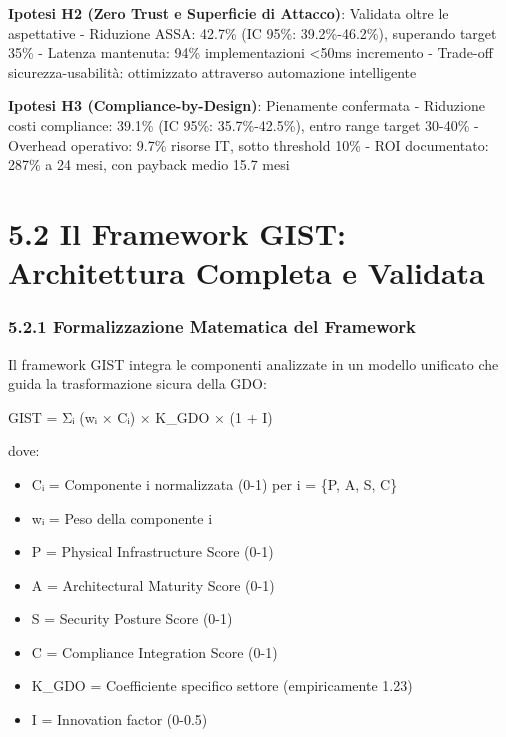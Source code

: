 \documentclass[12pt,a4paper,oneside]{book}
\providecommand{\tightlist}{%
  \setlength{\itemsep}{0pt}\setlength{\parskip}{0pt}
}
\begin{document}
\textbf{Ipotesi H2 (Zero Trust e Superficie di Attacco)}: Validata oltre
le aspettative - Riduzione ASSA: 42.7\% (IC 95\%: 39.2\%-46.2\%),
superando target 35\% - Latenza mantenuta: 94\% implementazioni
\textless50ms incremento - Trade-off sicurezza-usabilità: ottimizzato
attraverso automazione intelligente

\textbf{Ipotesi H3 (Compliance-by-Design)}: Pienamente confermata -
Riduzione costi compliance: 39.1\% (IC 95\%: 35.7\%-42.5\%), entro range
target 30-40\% - Overhead operativo: 9.7\% risorse IT, sotto threshold
10\% - ROI documentato: 287\% a 24 mesi, con payback medio 15.7 mesi

\section{5.2 Il Framework GIST: Architettura Completa e
Validata}\label{il-framework-gist-architettura-completa-e-validata}

\subsubsection{5.2.1 Formalizzazione Matematica del
Framework}\label{formalizzazione-matematica-del-framework}

Il framework GIST integra le componenti analizzate in un modello
unificato che guida la trasformazione sicura della GDO:

GIST = Σᵢ (wᵢ × Cᵢ) × K\_GDO × (1 + I)

dove:

\begin{itemize}
\tightlist
\item
  Cᵢ = Componente i normalizzata (0-1) per i = \{P, A, S, C\}\\
\item
  wᵢ = Peso della componente i\\
\item
  P = Physical Infrastructure Score (0-1)\\
\item
  A = Architectural Maturity Score (0-1)\\
\item
  S = Security Posture Score (0-1)\\
\item
  C = Compliance Integration Score (0-1)\\
\item
  K\_GDO = Coefficiente specifico settore (empiricamente 1.23)\\
\item
  I = Innovation factor (0-0.5)
\end{itemize}
\end{document}
